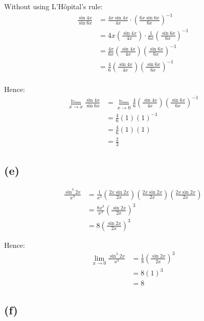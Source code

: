 \documentclass[11pt]{article}
\begin{document}
Without using L'H\(\text{\^o}\)pital's rule:
\begin{align*}
\frac{\sin 4x}{\sin 6x} &= \frac{4x \sin 4x}{4x} \cdot \left( \frac{6x \sin 6x}{6x} \right)^{-1} \\
&= 4x \left( \frac{\sin 4x}{4x} \right) \cdot \frac{1}{6x} \left( \frac{\sin 6x}{6x} \right)^{-1} \\
&= \frac{4x}{6x} \left( \frac{\sin 4x}{4x} \right) \left( \frac{\sin 6x}{6x} \right)^{-1} \\
&= \frac{4}{6} \left( \frac{\sin 4x}{4x} \right) \left( \frac{\sin 6x}{6x} \right)^{-1} \\
\end{align*}

Hence:
\begin{align*}
\lim_{x \rightarrow x} \frac{\sin 4x}{\sin 6x} &= \lim_{x \rightarrow 0} \frac{4}{6} \left( \frac{\sin 4x}{4x} \right) \left( \frac{\sin 6x}{6x} \right)^{-1} \\
&= \frac{4}{6}(1)(1)^{-1} \\
&= \frac{4}{6}(1)(1) \\
&= \frac{2}{3}
\end{align*}

\subsection{(e)}
\label{sec:orgeef30f9}

\begin{align*}
\frac{\sin^3 2x}{x^3} &= \frac{1}{x^3} \left(\frac{2x \sin 2x}{2x} \right) \left(\frac{2x \sin 2x}{2x} \right) \left(\frac{2x \sin 2x}{2x} \right) \\
&= \frac{8x^3}{x^3} \left( \frac{\sin 2x}{2x} \right)^3 \\
&= 8 \left( \frac{\sin 2x}{2x} \right)^3
\end{align*}

Hence:
\begin{align*}
\lim_{x \rightarrow 0} \frac{\sin^3 2x}{x^3} &= \frac{1}{8} \left( \frac{\sin 2x}{2x} \right)^3 \\
&= 8 (1)^3 \\
&= 8
\end{align*}

\newpage

\subsection{(f)}
\label{sec:org059dba0}
\end{document}
